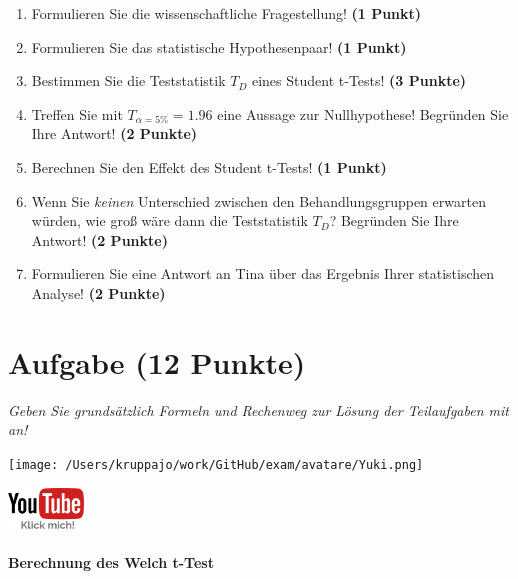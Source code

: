 \documentclass[a4paper, 9pt]{scrartcl}\usepackage[]{graphicx}\usepackage[]{xcolor}
\begin{document}
\begin{enumerate}
  \item Formulieren Sie die wissenschaftliche Fragestellung! \textbf{(1 Punkt)}
  \item Formulieren Sie das statistische Hypothesenpaar! \textbf{(1 Punkt)}
  \item Bestimmen Sie die Teststatistik $T_{D}$ eines Student t-Tests! \textbf{(3 Punkte)}
\item Treffen Sie mit $T_{\alpha = 5\%} = 1.96$ eine Aussage zur Nullhypothese! Begründen Sie Ihre Antwort! \textbf{(2 Punkte)}
\item Berechnen Sie den Effekt des Student t-Tests! \textbf{(1 Punkt)}
\item Wenn Sie \textit{keinen} Unterschied zwischen den Behandlungsgruppen erwarten würden, wie groß wäre dann die Teststatistik $T_{D}$? Begründen Sie Ihre Antwort! \textbf{(2 Punkte)}
\item Formulieren Sie eine Antwort an Tina über das Ergebnis Ihrer statistischen Analyse! \textbf{(2 Punkte)}
\end{enumerate} 
\clearpage

\section{Aufgabe \hfill (12 Punkte)}

\textit{Geben Sie grundsätzlich Formeln und Rechenweg zur Lösung der Teilaufgaben mit an!} \\[1Ex]
 

 
\begin{minipage}[t]{0.5\textwidth}
\texttt{[image: /Users/kruppajo/work/GitHub/exam/avatare/Yuki.png]}
\end{minipage}
\begin{minipage}[t]{0.5\textwidth}
\hfill
\href{https://youtu.be/TbSEOMCQYl4}{\includegraphics[width = 2cm]{img/youtube}}
\end{minipage}
\vspace{-3ex}



\paragraph{Berechnung des Welch t-Test}
\end{document}
